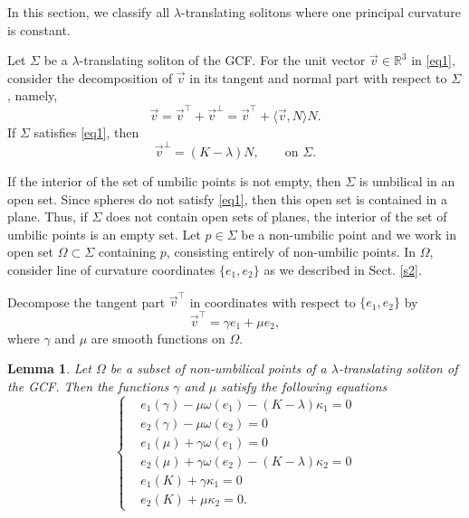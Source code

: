 \documentclass[a4paper,12pt]{amsart}
\newtheorem{lemma}[theorem]{Lemma}
\theoremstyle{definition}
\begin{document}
 In this section, we classify all $\lambda$-translating solitons where  one principal curvature is constant. 
 
Let $\Sigma$ be a  $\lambda$-translating soliton of the GCF.  For   the unit vector $\vec{v}\in\mathbb{R}^3$ in \eqref{eq1}, consider the decomposition of $\vec{v}$ in its tangent and normal part with respect to $\Sigma$, namely, 
$$\vec{v}=\vec{v}^\top+\vec{v}^\perp=\vec{v}^\top+ \langle\vec{v},N\rangle N.$$
If $\Sigma$ satisfies \eqref{eq1}, then  
$$\vec{v}^\perp=(K-\lambda)N,\qquad \mbox{on $\Sigma$.}$$


If the interior of the set of umbilic points is not empty, then $\Sigma$ is umbilical in an open set. Since spheres do not satisfy \eqref{eq1}, then this open set is contained in a plane. Thus, if $\Sigma$ does not contain open sets of planes, the interior  of the set of umbilic points is an empty set. Let $p\in \Sigma$ be a non-umbilic point  and we work in open set $\Omega\subset \Sigma$ containing $p$, consisting entirely of non-umbilic points. In $\Omega$, consider line of curvature coordinates $\{e_1,e_2\}$ as we   described in Sect. \ref{s2}.


Decompose the   tangent part $\vec{v}^\top$ in coordinates   with respect to $\{e_1,e_2\}$ by
\begin{equation}\label{vtop}
\vec{v}^{\top}=\gamma e_{1}+\mu e_{2},
\end{equation}
where $\gamma$ and $\mu$ are smooth functions on $\Omega$. 

\begin{lemma}\label{l1}
Let $\Omega$ be a subset of non-umbilical points of a $\lambda$-translating soliton of the GCF. Then the functions   $\gamma$ and $\mu$ satisfy the following equations
    \begin{equation}\label{b3}
    \left\{
\begin{split}
            &e_{1}(\gamma)-\mu\omega(e_1)-(K-\lambda)\kappa_1=0\\
            &e_{2}(\gamma)-\mu\omega(e_2)=0\\
            &e_{1}(\mu)+\gamma\omega(e_1)=0\\
            &e_{2}(\mu)+\gamma\omega(e_2)-(K-\lambda)\kappa_2=0\\
            &e_{1}(K)+\gamma\kappa_1=0\\
            &e_{2}(K)+\mu\kappa_2=0.
        \end{split}\right.
    \end{equation}
\end{lemma}
\end{document}
